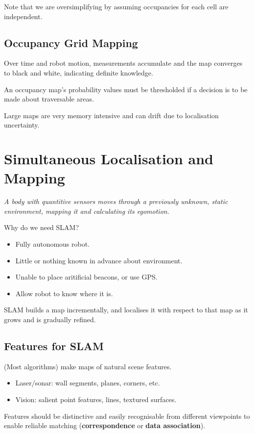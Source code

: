 \documentclass[11pt]{article}
\begin{document}
Note that we are oversimplifying by assuming occupancies for each cell are independent.

\subsection{Occupancy Grid Mapping}
Over time and robot motion, measurements accumulate and the map converges to black and white, indicating definite knowledge.

An occupancy map's probability values must be thresholded if a decision is to be made about traversable areas.

Large maps are very memory intensive and can drift due to localisation uncertainty.

\section{Simultaneous Localisation and Mapping}
\textit{A body with quantitive sensors moves through a previously unknown, static environment, mapping it and calculating its egomotion.}

Why do we need SLAM?
\begin{itemize}
  \item Fully autonomous robot.
  \item Little or nothing known in advance about environment.
  \item Unable to place aritificial beacons, or use GPS.
  \item Allow robot to know where it is.
\end{itemize}

SLAM builds a map incrementally, and localises it with respect to that map as it grows and is gradually refined.

\subsection{Features for SLAM}
(Most algorithms) make maps of natural scene features.
\begin{itemize}
  \item Laser/sonar: wall segments, planes, corners, etc.\
  \item Vision: salient point features, lines, textured surfaces.
\end{itemize}

Features should be distinctive and easily recognisable from different viewpoints to enable reliable matching (\textbf{correspondence} or \textbf{data association}).
\end{document}
